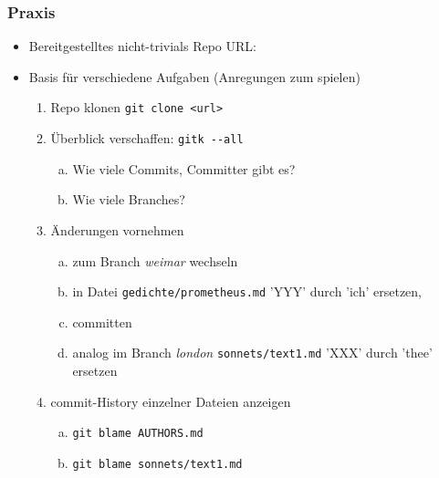 \documentclass{beamer}
\begin{document}
\begin{frame}[fragile,label=uebung10]
\frametitle{Praxis}
\begin{itemize}
 \item Bereitgestelltes nicht-trivials Repo URL:
 \item Basis für verschiedene Aufgaben (Anregungen zum spielen)
\begin{enumerate}
 \item Repo klonen \texttt{git clone <url>}
 \item Überblick verschaffen: \verb|gitk --all|
 \begin{enumerate}[a)]
  \item Wie viele Commits, Committer gibt es?
  \item Wie viele Branches?
 \end{enumerate}
 \item Änderungen vornehmen
 \begin{enumerate}[a)]
 \item zum Branch \textit{weimar} wechseln
 \item in Datei \verb|gedichte/prometheus.md| 'YYY' durch 'ich' ersetzen,
 \item committen
 \item analog im Branch \textit{london} \verb|sonnets/text1.md| 'XXX' durch 'thee' ersetzen
 \end{enumerate}
 \item commit-History einzelner Dateien anzeigen
 \begin{enumerate}[a)]
  \item \verb|git blame AUTHORS.md|
  \item \verb|git blame sonnets/text1.md|
 \end{enumerate}
\setcounter{taskcounter}{\value{enumi}}
\end{enumerate}

\end{itemize}

\end{frame}


\end{document}
